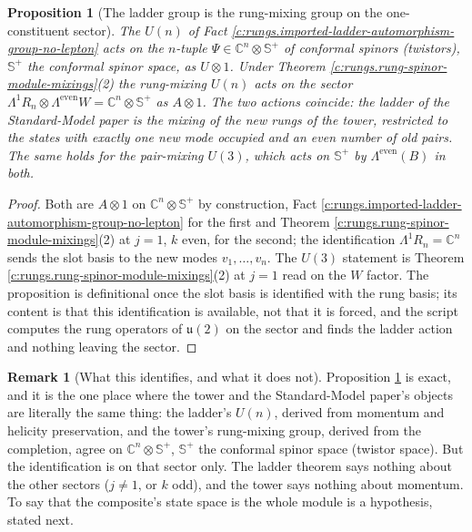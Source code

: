 \documentclass[11pt]{article}
\newtheorem{proposition}[theorem]{Proposition}
\theoremstyle{definition}
\newtheorem{remark}[theorem]{Remark}
\theoremstyle{plain}
\providecommand{\C}{}\renewcommand{\C}{\mathbb{C}}
\providecommand{\CS}{}\renewcommand{\CS}{{\mathbb{S}^{+}}}
\providecommand{\uu}{}\renewcommand{\uu}{\mathfrak{u}}
\begin{document}
\begin{proposition}[The ladder group is the rung-mixing group on the one-constituent sector]\label{c:rungs.ladder-group-rung-mixing-group-one}
The $U(n)$ of Fact \ref{c:rungs.imported-ladder-automorphism-group-no-lepton} acts on the $n$-tuple $\Psi \in \C^{n} \otimes \CS$ of conformal spinors (twistors), $\CS$ the conformal spinor space, as $U \otimes 1$. Under Theorem \ref{c:rungs.rung-spinor-module-mixings}(2) the rung-mixing $U(n)$ acts on the sector $\Lambda^{1}R_{n} \otimes \Lambda^{\mathrm{even}}W = \C^{n} \otimes \CS$ as $A \otimes 1$. The two actions coincide: the ladder of the Standard-Model paper is the mixing of the new rungs of the tower, restricted to the states with exactly one new mode occupied and an even number of old pairs. The same holds for the pair-mixing $U(3)$, which acts on $\CS$ by $\Lambda^{\mathrm{even}}(B)$ in both.
\end{proposition}
\begin{proof}
Both are $A \otimes 1$ on $\C^{n} \otimes \CS$ by construction, Fact \ref{c:rungs.imported-ladder-automorphism-group-no-lepton} for the first and Theorem \ref{c:rungs.rung-spinor-module-mixings}(2) at $j = 1$, $k$ even, for the second; the identification $\Lambda^{1}R_{n} = \C^{n}$ sends the slot basis to the new modes $v_{1}, \ldots, v_{n}$. The $U(3)$ statement is Theorem \ref{c:rungs.rung-spinor-module-mixings}(2) at $j = 1$ read on the $W$ factor. The proposition is definitional once the slot basis is identified with the rung basis; its content is that this identification is available, not that it is forced, and the script computes the rung operators of $\uu(2)$ on the sector and finds the ladder action and nothing leaving the sector.

\end{proof}

\begin{remark}[What this identifies, and what it does not]\label{c:note.rungs.what-identifies-what-it-does-not}
Proposition \ref{c:rungs.ladder-group-rung-mixing-group-one} is exact, and it is the one place where the tower and the Standard-Model paper's objects are literally the same thing: the ladder's $U(n)$, derived from momentum and helicity preservation, and the tower's rung-mixing group, derived from the completion, agree on $\C^{n} \otimes \CS$, $\CS$ the conformal spinor space (twistor space). But the identification is on that sector only. The ladder theorem says nothing about the other sectors ($j \neq 1$, or $k$ odd), and the tower says nothing about momentum. To say that the composite's state space is the whole module is a hypothesis, stated next.
\end{remark}
\end{document}
